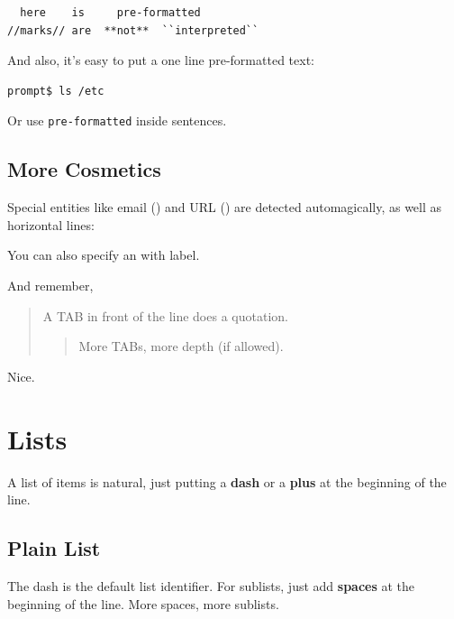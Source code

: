 \documentclass{article}
\begin{document}
\begin{verbatim}
  here    is     pre-formatted
//marks// are  **not**  ``interpreted``
\end{verbatim}

And also, it's easy to put a one line pre-formatted
text:

\begin{verbatim}
prompt$ ls /etc
\end{verbatim}

Or use \texttt{pre-formatted} inside sentences.

\subsection*{More Cosmetics}

Special entities like email () and
URL () are detected automagically,
as well as horizontal lines:

\hrulefill{}

\clearpage

You can also specify an 
with label.

And remember,

	\begin{quotation}
A TAB in front of the line does a quotation.
		\begin{quotation}
More TABs, more depth (if allowed).
		\end{quotation}
	\end{quotation}

Nice.

\section*{Lists}

A list of items is natural, just putting a \textbf{dash} or
a \textbf{plus} at the beginning of the line.

\subsection*{Plain List}

The dash is the default list identifier. For sublists,
just add \textbf{spaces} at the beginning of the line. More
spaces, more sublists.
\end{document}
